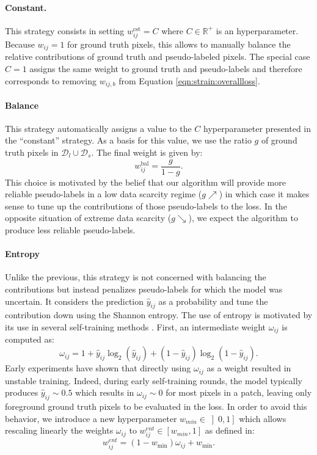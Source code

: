 \paragraph{Constant.} This strategy consists in setting $w^{\text{cst}}_{ij} = C$ where $C \in \mathbb{R}^+$ is an hyperparameter. Because $w_{ij} = 1$ for ground truth pixels, this allows to manually balance the relative contributions of ground truth and pseudo-labeled pixels. The special case $C = 1$ assigns the same weight to ground truth and pseudo-labels and therefore corresponds to removing $w_{ij,b}$ from Equation \ref{eqn:strain:overallloss}.

\paragraph{Balance} This strategy automatically assigns a value to the $C$ hyperparameter presented in the ``constant'' strategy. As a basis for this value, we use the ratio $g$ of ground truth pixels in $\mathcal{D}_l \cup \mathcal{D}_s$. The final weight is given by: 
\begin{equation}
w^{\text{bal}}_{ij} = \frac{g}{1 - g}.
\label{eqn:strain:balancegt}
\end{equation}
This choice is motivated by the belief that our algorithm will provide more reliable pseudo-labels in a low data scarcity regime ($g \nearrow $) in which case it makes sense to tune up the contributions of those pseudo-labels to the loss. In the opposite situation of extreme data scarcity ($g \searrow $), we expect the algorithm to produce less reliable pseudo-labels. 

\paragraph{Entropy} \label{par:strain:entropyweight} Unlike the previous, this strategy is not concerned with balancing the contributions but instead penalizes pseudo-labels for which the model was uncertain. It considers the prediction $\hat{y}_{ij}$ as a probability and tune the contribution down using the Shannon entropy. The use of entropy is motivated by its use in several self-training methods \cite{grandvalet2004semi,lee2013pseudo}. First, an intermediate weight $\omega_{ij}$ is computed as: 
\begin{equation}
\omega_{ij} = 1 + \hat{y}_{ij} \log_2(\hat{y}_{ij}) + (1 - \hat{y}_{ij}) \log_2(1 - \hat{y}_{ij}).
\label{eqn:strain:entropyweight}
\end{equation}
Early experiments have shown that directly using $\omega_{ij}$ as a weight resulted in unstable training. Indeed, during early self-training rounds, the model typically produces $\hat{y}_{ij} \sim 0.5$ which results in $\omega_{ij} \sim 0$ for most pixels in a patch, leaving only foreground ground truth pixels to be evaluated in the loss. In order to avoid this behavior, we introduce a new hyperparameter $w_{min} \in \left]0, 1\right]$ which allows rescaling linearly the weights $\omega_{ij}$ to $w^{ent}_{ij} \in [w_{min},1]$ as defined in:
\begin{equation}
w^{ent}_{ij} = \left(1 - w_{\text{min}}\right) \omega_{ij} + w_{\text{min}}.
\label{eqn:strain:wminrescale}
\end{equation}

